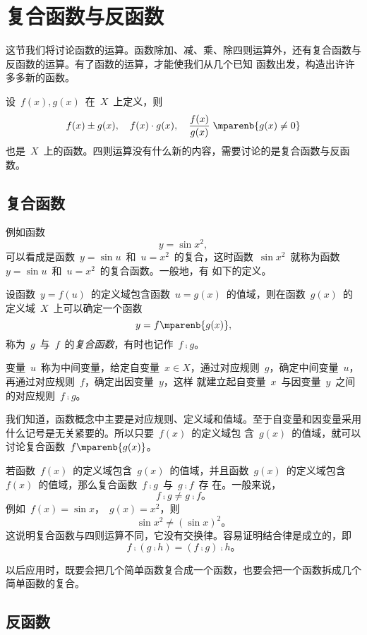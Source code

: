 \section{复合函数与反函数}

这节我们将讨论函数的运算。函数除加、减、乘、除四则运算外，还有复合函数与反函数的运算。有了函数的运算，才能使我们从几个已知
函数出发，构造出许许多多新的函数。

设~$f(x),g(x)$~在~$X$~上定义，则
\[
  f(x)\pm g(x),\quad f(x)\cdot g(x),\quad\frac{f(x)}{g(x)}\;\mparenb{g(x)\neq0}
\]
也是~$X$~上的函数。四则运算没有什么新的内容，需要讨论的是复合函数与反函数。

\subsection{复合函数}

例如函数
\[
  y=\sin x^2,
\]
可以看成是函数~$y=\sin u$~和~$u=x^2$~的复合，这时函数~$\sin x^2$~就称为函数~$y=\sin u$~和~$u=x^2$~的复合函数。一般地，有
如下的定义。

\begin{definition}
设函数~$y=f(u)$~的定义域包含函数~$u=g(x)$~的值域，则在函数~$g(x)$~的定义域~$X$~上可以确定一个函数
\[
  y=f\mparenb{g(x)},
\]
称为~$g$~与~$f$~的\emph{复合函数}，有时也记作~$f\comp g$。
\end{definition}

变量~$u$~称为中间变量，给定自变量~$x\in X$，通过对应规则~$g$，确定中间变量~$u$，再通过对应规则~$f$，确定出因变量~$y$，这样
就建立起自变量~$x$~与因变量~$y$~之间的对应规则~$f\comp g$。

我们知道，函数概念中主要是对应规则、定义域和值域。至于自变量和因变量采用什么记号是无关紧要的。所以只要~$f(x)$~的定义域包
含~$g(x)$~的值域，就可以讨论复合函数~$f\mparenb{g(x)}$。

若函数~$f(x)$~的定义域包含~$g(x)$~的值域，并且函数~$g(x)$~的定义域包含~$f(x)$~的值域，那么复合函数~$f\comp g$~与~$g\comp f$~存
在。一般来说，
\[
  f\comp g\neq g\comp f。
\]
例如~$f(x)=\sin x$，~$g(x)=x^2$，则
\[
  \sin x^2\neq(\sin x)^2。
\]
这说明复合函数与四则运算不同，它没有交换律。容易证明结合律是成立的，即
\[
  f\comp(g\comp h)=(f\comp g)\comp h。
\]

以后应用时，既要会把几个简单函数复合成一个函数，也要会把一个函数拆成几个简单函数的复合。


\subsection{反函数}

